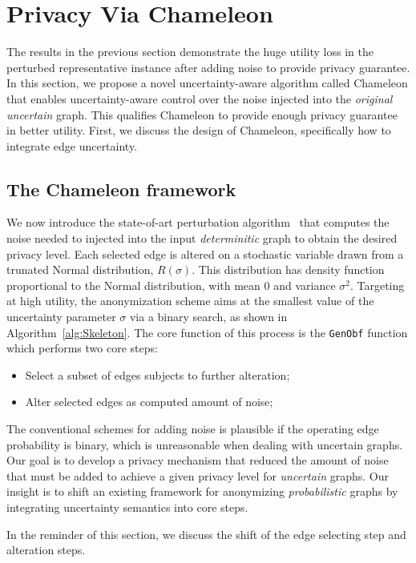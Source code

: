 \section{Privacy Via Chameleon}
The results in the previous section demonstrate the huge utility loss in the perturbed representative instance after adding noise to provide privacy guarantee. In this section, we propose a novel uncertainty-aware algorithm called Chameleon that enables uncertainty-aware control over the noise injected into the \emph{original uncertain} graph. This qualifies Chameleon to provide enough privacy guarantee in better utility. First, we discuss the design of Chameleon, specifically how to integrate edge uncertainty. 



\subsection{The Chameleon framework}

We now introduce the state-of-art perturbation algorithm~\cite{Boldi_Injecting_2012} that computes the noise needed to injected into the input \emph{determinitic} graph to obtain the desired privacy level. Each selected edge is altered on a stochastic variable drawn from a trunated Normal distribution, $R(\sigma)$. This distribution has density function proportional to the Normal distribution, with mean $0$ and variance $\sigma^2$. Targeting at high utility, the anonymization scheme aims at the smallest value of the uncertainty parameter $\sigma$ via a binary search, as shown in Algorithm~\ref{alg:Skeleton}. The core function of this process is the \texttt{GenObf} function which performs two core steps:
\begin{itemize}
    \item{Select a subset of edges subjects to further alteration;}
    \item{Alter selected edges as computed amount of noise;}
\end{itemize}

The conventional schemes for adding noise is plausible if the operating edge probability is binary, which is unreasonable when dealing with uncertain graphs. Our goal is to develop a privacy mechanism that reduced the amount of noise that must be added to achieve a given privacy level for \emph{uncertain} graphs. Our insight is to shift an existing framework for anonymizing \emph{probabilistic} graphs by integrating uncertainty semantics into core steps. 

In the reminder of this section, we discuss the shift of the edge selecting step and alteration steps. 

